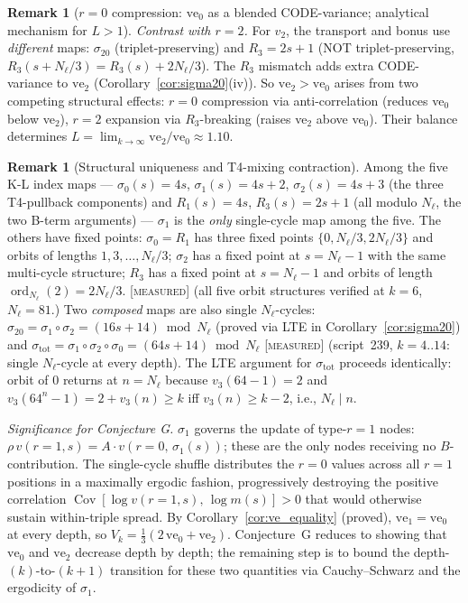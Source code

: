 \documentclass[11pt]{article}
\theoremstyle{definition}
\newtheorem{remark}[theorem]{Remark}
\newcommand{\MEASURED}{\textup{[\textsc{measured}]}}
\begin{document}
\begin{remark}[$r{=}0$ compression: $\mathrm{ve}_0$ as a blended CODE-variance;
analytical mechanism for $L>1$]
\noindent\emph{Contrast with $r{=}2$.} For $v_2$, the transport and bonus use
\emph{different} maps: $\sigma_{20}$ (triplet-preserving) and $R_3 = 2s{+}1$
(NOT triplet-preserving, $R_3(s{+}N_\ell/3) = R_3(s) + 2N_\ell/3$).
The $R_3$ mismatch adds extra CODE-variance to $\mathrm{ve}_2$
(Corollary~\ref{cor:sigma20}(iv)).
So $\mathrm{ve}_2 > \mathrm{ve}_0$ arises from two competing structural effects:
$r{=}0$ compression via anti-correlation (reduces ve$_0$ below ve$_2$),
$r{=}2$ expansion via $R_3$-breaking (raises ve$_2$ above ve$_0$).
Their balance determines $L = \lim_{k\to\infty}\mathrm{ve}_2/\mathrm{ve}_0 \approx 1.10$.
\end{remark}

\begin{remark}[Structural uniqueness and T4-mixing contraction]\label{rem:sigma1}
Among the five K-L index maps --- $\sigma_0(s)=4s$, $\sigma_1(s)=4s+2$,
$\sigma_2(s)=4s+3$ (the three T4-pullback components) and $R_1(s)=4s$,
$R_3(s)=2s+1$ (all modulo $N_\ell$, the two B-term arguments) ---
$\sigma_1$ is the \emph{only} single-cycle map among the five.
The others have fixed points: $\sigma_0 = R_1$ has three fixed points
$\{0, N_\ell/3, 2N_\ell/3\}$ and orbits of lengths $1, 3, \ldots, N_\ell/3$;
$\sigma_2$ has a fixed point at $s = N_\ell-1$ with the same multi-cycle
structure; $R_3$ has a fixed point at $s = N_\ell - 1$ and orbits of length
$\operatorname{ord}_{N_\ell}(2) = 2N_\ell/3$.
\MEASURED{} (all five orbit structures verified at $k=6$, $N_\ell = 81$.)
Two \emph{composed} maps are also single $N_\ell$-cycles:
$\sigma_{20} = \sigma_1\circ\sigma_2 = (16s{+}14)\bmod N_\ell$
(proved via LTE in Corollary~\ref{cor:sigma20})
and $\sigma_{\mathrm{tot}} = \sigma_1\circ\sigma_2\circ\sigma_0 = (64s{+}14)\bmod N_\ell$
\MEASURED{} (script~239, $k{=}4..14$: single $N_\ell$-cycle at every depth).
The LTE argument for $\sigma_{\mathrm{tot}}$ proceeds identically: orbit of
$0$ returns at $n=N_\ell$ because $v_3(64{-}1)=2$ and
$v_3(64^n{-}1)=2{+}v_3(n)\geq k$ iff $v_3(n)\geq k{-}2$, i.e., $N_\ell\mid n$.

\noindent\emph{Significance for Conjecture G.}
$\sigma_1$ governs the update of type-$r{=}1$ nodes:
$\rho\,v(r{=}1,s) = A \cdot v(r{=}0,\,\sigma_1(s))$;
these are the only nodes receiving no $B$-contribution.
The single-cycle shuffle distributes the $r{=}0$ values across all
$r{=}1$ positions in a maximally ergodic fashion, progressively
destroying the positive correlation
$\operatorname{Cov}[\log v(r{=}1,s),\,\log m(s)] > 0$
that would otherwise sustain within-triple spread.
By Corollary~\ref{cor:ve_equality} (proved),
$\mathrm{ve}_1 = \mathrm{ve}_0$ at every depth, so
$V_k = \tfrac{1}{3}(2\,\mathrm{ve}_0 + \mathrm{ve}_2)$.
Conjecture~G reduces to showing that $\mathrm{ve}_0$ and $\mathrm{ve}_2$
decrease depth by depth; the remaining step is to bound the
depth-$(k)$-to-$(k{+}1)$ transition for these two quantities
via Cauchy--Schwarz and the ergodicity of $\sigma_1$.


\end{remark}
\end{document}
